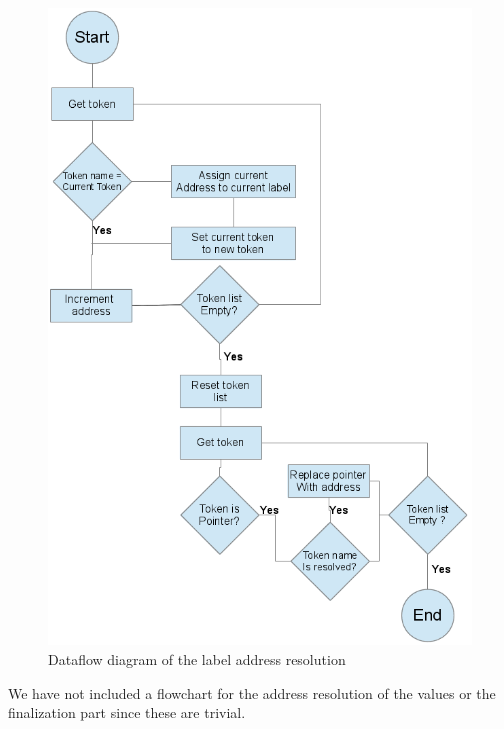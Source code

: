 \documentclass{article}
\begin{document}
\begin{figure}[H]
\begin{centering}
\includegraphics[width=\textwidth,height=\textheight,keepaspectratio]{address.png}
\caption{Dataflow diagram of the label address resolution}
\end{centering}
\end{figure}
\newpage
We have not included a flowchart for the address resolution of the values or
the finalization part since these are trivial.
\end{document}
